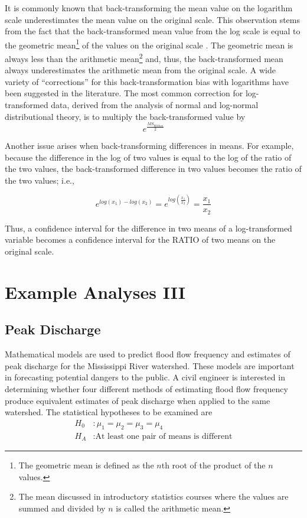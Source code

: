 \documentclass[10pt,openany]{book}\usepackage[]{graphicx}\usepackage[]{color}
\begin{document}
It is commonly known that back-transforming the mean value on the logarithm scale underestimates the mean value on the original scale.  This observation stems from the fact that the back-transformed mean value from the log scale is equal to the geometric mean\footnote{The geometric mean is defined as the $n$th root of the product of the $n$ values.} of the values on the original scale .  The geometric mean is always less than the arithmetic mean\footnote{The mean discussed in introductory statistics courses where the values are summed and divided by $n$ is called the arithmetic mean.} and, thus, the back-transformed mean always underestimates the arithmetic mean from the original scale.  A wide variety of ``corrections'' for this back-transformation bias with logarithms have been suggested in the literature.  The most common correction for log-transformed data, derived from the analysis of normal and log-normal distributional theory, is to multiply the back-transformed value by
\[ e^{\frac{MS_{Within}}{2}} \]

Another issue arises when back-transforming differences in means.  For example, because the difference in the log of two values is equal to the log of the ratio of the two values, the back-transformed difference in two values becomes the ratio of the two values; i.e.,

\[ e^{log(x_{1})-log(x_{2})} = e^{log(\frac{x_{1}}{x_{2}})} = \frac{x_{1}}{x_{2}} \]

Thus, a confidence interval for the difference in two means of a log-transformed variable becomes a confidence interval for the RATIO of two means on the original scale.

\section{Example Analyses III}
\subsection{Peak Discharge}

Mathematical models are used to predict flood flow frequency and estimates of peak discharge for the Mississippi River watershed.  These models are important in forecasting potential dangers to the public.  A civil engineer is interested in determining whether four different methods of estimating flood flow frequency produce equivalent estimates of peak discharge when applied to the same watershed.  The statistical hypotheses to be examined are
\[ \begin{split}
   H_{0}&: \mu_{1} = \mu_{2} = \mu_{3} = \mu_{4} \\
   H_{A}&:\text{At least one pair of means is different}
\end{split} \]
\end{document}
